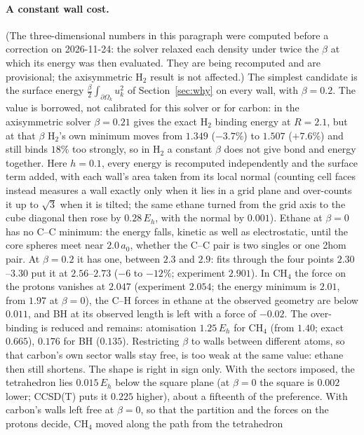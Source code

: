 \documentclass[11pt]{article}
\begin{document}
\paragraph{A constant wall cost.} (The three-dimensional numbers in this paragraph were computed before a
correction on 2026-11-24: the solver relaxed each density under twice the $\beta$ at which its energy was then
evaluated. They are being recomputed and are provisional; the axisymmetric H$_2$ result is not affected.)
The simplest candidate is the surface energy
$\tfrac{\beta}{2}\int_{\partial\Omega_k}u_k^2$ of Section~\ref{sec:why} on every wall, with $\beta = 0.2$. The
value is borrowed, not calibrated for this solver or for carbon: in the axisymmetric solver $\beta = 0.21$ gives
the exact H$_2$ binding energy at $R = 2.1$, but at that $\beta$ H$_2$'s own minimum moves from $1.349$
($-3.7\%$) to $1.507$ ($+7.6\%$) and still binds $18\%$ too strongly, so in H$_2$ a constant $\beta$ does not give
bond and energy together. Here $h = 0.1$, every energy is recomputed independently and the surface term added,
with each wall's area taken from its local normal (counting cell faces instead measures a wall exactly only when
it lies in a grid plane and over-counts it up to $\sqrt3$ when it is tilted; the same ethane turned from the grid
axis to the cube diagonal then rose by $0.28\,E_h$, with the normal by $0.001$). Ethane at $\beta = 0$ has no C--C
minimum: the energy falls, kinetic as well as electrostatic, until the core spheres meet near $2.0\,a_0$, whether
the C--C pair is two singles or one 2hom pair. At $\beta = 0.2$ it has one, between $2.3$ and $2.9$: fits through
the four points $2.30$--$3.30$ put it at $2.56$--$2.73$ ($-6$ to $-12\%$; experiment $2.901$). In CH$_4$ the force
on the protons vanishes at $2.047$ (experiment $2.054$; the energy minimum is $2.01$, from $1.97$ at $\beta = 0$),
the C--H forces in ethane at the observed geometry are below $0.011$, and BH at its observed length is left with
a force of $-0.02$. The over-binding is reduced and remains: atomisation $1.25\,E_h$ for CH$_4$ (from $1.40$; exact
$0.665$), $0.176$ for BH ($0.135$). Restricting $\beta$ to walls between different atoms, so that carbon's own
sector walls stay free, is too weak at the same value: ethane then still shortens. The shape is right in sign
only. With the sectors imposed, the tetrahedron lies $0.015\,E_h$ below the square plane (at $\beta = 0$ the
square is $0.002$ lower; CCSD(T) puts it $0.225$ higher), about a fifteenth of the preference. With carbon's
walls left free at $\beta = 0$, so
that the partition and the forces on the protons decide, CH$_4$ moved along the path from the tetrahedron
\end{document}
